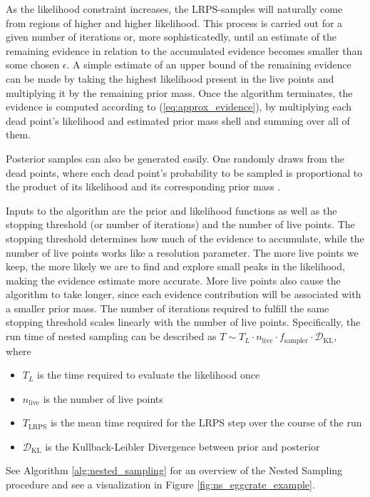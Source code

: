\documentclass[12pt, a4paper]{report}
\begin{document}
As the likelihood constraint increases, the LRPS-samples will naturally come from regions of higher and higher likelihood.
This process is carried out for a given number of iterations or, more sophisticatedly, until an estimate of the remaining evidence in relation to the accumulated evidence becomes smaller than some chosen $\epsilon$.
A simple estimate of an upper bound of the remaining evidence can be made by taking the highest likelihood present in the live points and multiplying it by the remaining prior mass.
Once the algorithm terminates, the evidence is computed according to (\ref{eq:approx_evidence}), by multiplying each dead point's likelihood and estimated prior mass shell and summing over all of them.

Posterior samples can also be generated easily.
One randomly draws from the dead points, where each dead point's probability to be sampled is proportional to the product of its likelihood and its corresponding prior mass \cite[9]{nested_sampling_talk}.

Inputs to the algorithm are the prior and likelihood functions as well as the stopping threshold (or number of iterations) and the number of live points.
The stopping threshold determines how much of the evidence to accumulate, while the number of live points works like a resolution parameter.
The more live points we keep, the more likely we are to find and explore small peaks in the likelihood, making the evidence estimate more accurate.
More live points also cause the algorithm to take longer, since each evidence contribution will be associated with a smaller prior mass.
The number of iterations required to fulfill the same stopping threshold scales linearly with the number of live points.
Specifically, the run time of nested sampling can be described as $T \sim T_L \cdot n_{\textrm{live}} \cdot f_{\textrm{sampler}} \cdot \mathcal{D}_{\textrm{KL}}$, where
\begin{itemize}
    \item $T_L$ is the time required to evaluate the likelihood once
    \item $n_{\textrm{live}}$ is the number of live points
    \item $T_{\textrm{LRPS}}$ is the mean time required for the LRPS step over the course of the run
    \item $\mathcal{D}_{\textrm{KL}}$ is the Kullback-Leibler Divergence \cite[6]{kld} between prior and posterior \cite[1]{nested_sampling_talk}
\end{itemize}
See Algorithm \ref{alg:nested_sampling} for an overview of the Nested Sampling procedure and see a visualization in Figure \ref{fig:ns_eggcrate_example}.
\end{document}

